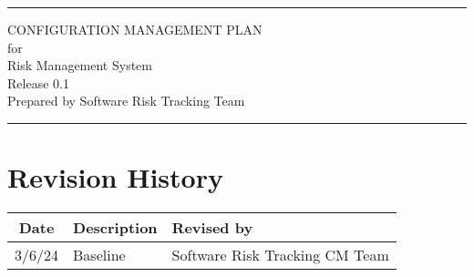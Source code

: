 \documentclass[letterpaper,12pt,oneside,listof=totoc]{scrreprt}
\date{\today}
\author{} %
\def\myversion{1.0 }
\begin{document}
\begin{titlepage}
\flushright
\rule{\textwidth}{5pt}\vskip1cm
\Huge{CONFIGURATION MANAGEMENT PLAN}\\
\vspace{1.5cm}
for\\
\vspace{1.5cm}
Risk Management System\\
\vspace{1.5cm}
\LARGE{Release 0.1\\}
\vspace{1.5cm}
\vspace{1.5cm}
Prepared by Software Risk Tracking Team\\
\vfill
\rule{\textwidth}{5pt}
\end{titlepage}

\tableofcontents

\listoffigures

\listoftables

\chapter*{Revision History}

\begin{tabular}{| c | p{} | p{} |}
\hline
Date     & Description   & Revised by \\
\hline
3/6/24 & Baseline & Software Risk Tracking CM Team \\
\hline
\end{tabular}

%
% 
% 
% 
\end{document}
